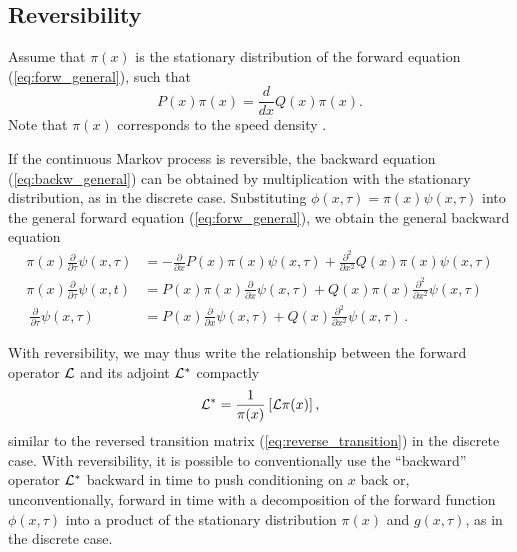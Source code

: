 \documentclass[preprint]{elsarticle}
\begin{document}
\subsection{Reversibility}

Assume that $\pi(x)$ is the stationary distribution of the forward equation (\ref{eq:forw_general}), such that 
\begin{equation}
P(x)\pi(x)=\frac{d}{d x}Q(x)\pi(x).
\end{equation}
Note that $\pi(x)$ corresponds to the speed density \citep{Ewen04,Song12}. 

If the continuous Markov process is reversible, the backward equation (\ref{eq:backw_general}) can be obtained by multiplication with the stationary distribution, as in the discrete case. Substituting $\phi(x,\tau)=\pi(x)\psi(x,\tau)$ into the general forward equation (\ref{eq:forw_general}), we obtain the general backward equation
\begin{equation}
\begin{split}
\pi(x)\frac{\partial}{\partial \tau} \psi(x,\tau)&=-\frac{\partial}{\partial x}P(x)\pi(x)\psi(x,\tau)+\frac{\partial^2}{\partial x^2}Q(x)\pi(x) \psi(x,\tau)\\
\pi(x)\frac{\partial}{\partial \tau}\psi(x,t)&=P(x)\pi(x)\frac{\partial}{\partial x}\psi(x,\tau) +Q(x)\pi(x)\frac{\partial^2}{\partial x^2}\psi(x,\tau)\\\
\frac{\partial}{\partial \tau}\psi(x,\tau)&=P(x)\frac{\partial}{\partial x}\psi(x,\tau)+Q(x)\frac{\partial^2}{\partial x^2}\psi(x,\tau)\,.
\end{split}
\end{equation}

With reversibility, we may thus write the relationship between the forward operator ${\cal L}$ and its adjoint ${\cal L}^{*}$ compactly
\begin{equation}\label{compact}
{\cal L}^{*}=\frac1{\pi(x)}\left[{\cal L}\pi(x)\right],
\end{equation}
similar to the reversed transition matrix (\ref{eq:reverse_transition}) in the discrete case. With reversibility, it is possible to conventionally use the ``backward'' operator ${\cal L}^{*}$ backward in time to push conditioning on $x$ back or, unconventionally, forward in time with a decomposition of the forward function  $\phi(x,\tau)$ into a product of the stationary distribution $\pi(x)$ and $g(x,\tau)$, as in the discrete case.
\end{document}
